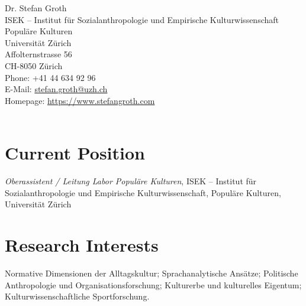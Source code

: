 \documentclass[11pt, a4paper]{article} %
\newcommand{\years}[1]{\marginnote{\scriptsize #1}} %
\begin{document}
{\LARGE Dr. Stefan Groth}\\[1cm] %
ISEK – Institut für Sozialanthropologie und Empirische Kulturwissenschaft\\
Populäre Kulturen\\ 
Universität Zürich\\
Affolternstrasse 56\\  
CH-8050 Zürich\\[.2cm]  
Phone: +41 44 634 92 96\\ %
E-Mail: \href{mailto:stefan.groth@uzh.ch}{stefan.groth@uzh.ch}\\
Homepage: \href{https://www.stefangroth.com}{https://www.stefangroth.com}\\\\
\section*{Current Position}
\years{seit 09/2016}\emph{Oberassistent / Leitung Labor Populäre Kulturen}, ISEK – Institut für Sozialanthropologie und Empirische Kulturwissenschaft, Populäre Kulturen, Universität Zürich %
\section*{Research Interests}
    Normative Dimensionen der Alltagskultur; 
    Sprachanalytische Ansätze; 
    Politische Anthropologie und Organisationsforschung; 
    Kulturerbe und kulturelles Eigentum; 
    Kulturwissenschaftliche Sportforschung.
\end{document}
